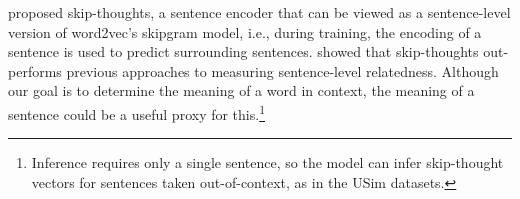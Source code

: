 \documentclass[11pt]{article}
\newcommand\glove{GloVe\xspace}
\begin{document}
 proposed skip-thoughts, a sentence encoder that can
be viewed as a sentence-level version of word2vec's skipgram model,
i.e., during training, the encoding of a sentence is used to predict
surrounding sentences.   showed that
skip-thoughts out-performs previous approaches to measuring
sentence-level relatedness.  Although our goal is to determine the
meaning of a word in context, the meaning of a sentence could be a
useful proxy for this.\footnote{Inference requires only a single
  sentence, so the model can infer skip-thought vectors for sentences
  taken out-of-context, as in the USim datasets.}








\end{document}

